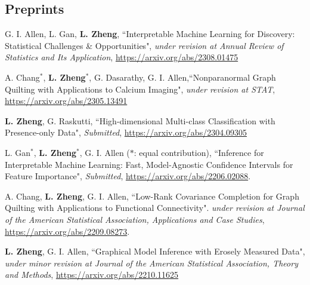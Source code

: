 \documentclass[letterpaper,11pt]{article}
\begin{document}
	\subsection*{Preprints}
	\begin{etaremune}[start=13]
		\item G. I. Allen, L. Gan, {\bf L. Zheng}, ``Interpretable Machine Learning for Discovery: Statistical Challenges \& Opportunities", {\em under revision at Annual Review of Statistics and Its Application}, \href{https://arxiv.org/abs/2308.01475}{https://arxiv.org/abs/2308.01475}
		\item  A. Chang$^{*}$, {\bf L. Zheng}$^{*}$, G. Dasarathy, G. I. Allen,``Nonparanormal Graph Quilting with Applications to Calcium Imaging", {\em under revision at STAT}, \href{https://arxiv.org/abs/2305.13491}{https://arxiv.org/abs/2305.13491}
		\item {\bf L. Zheng}, G. Raskutti, ``High-dimensional Multi-class Classification with Presence-only Data", {\em Submitted},  \href{https://arxiv.org/abs/2304.09305}{https://arxiv.org/abs/2304.09305}
		\item L. Gan$^{*}$, {\bf L. Zheng}$^{*}$, G. I. Allen ($*$: equal contribution), ``Inference for Interpretable Machine Learning: Fast, Model-Agnostic Confidence Intervals for Feature Importance", {\em Submitted},  \href{https://arxiv.org/abs/2206.02088}{https://arxiv.org/abs/2206.02088}.
		\item A. Chang, {\bf L. Zheng}, G. I. Allen, ``Low-Rank Covariance Completion for Graph Quilting with Applications to Functional Connectivity". {\em under revision at Journal of the American Statistical Association, Applications and Case Studies}, \href{https://arxiv.org/abs/2209.08273}{https://arxiv.org/abs/2209.08273}.
		\item {\bf L. Zheng}, G. I. Allen, ``Graphical Model Inference with Erosely Measured Data", {\em under minor revision at Journal of the American Statistical Association, Theory and Methods}, \href{https://arxiv.org/abs/2210.11625}{https://arxiv.org/abs/2210.11625}
	\end{etaremune}
\end{document}
